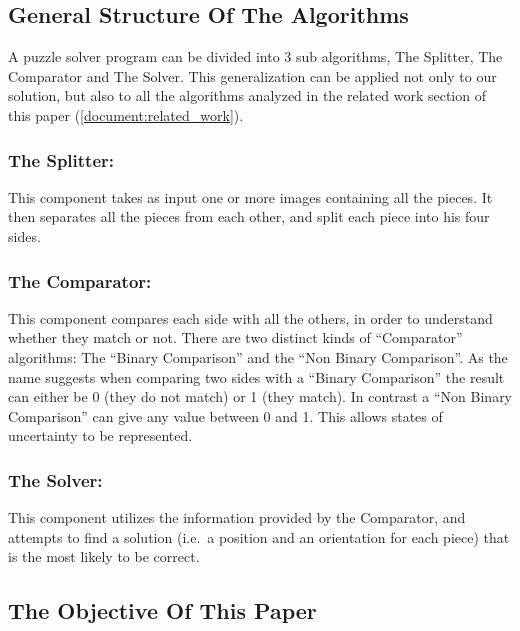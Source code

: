 \documentclass{article}
\newenvironment{indented_section}
  {\adjustwidth{3em}{0pt}}
  {\endadjustwidth}
\begin{document}
\subsection{General Structure Of The Algorithms}

A puzzle solver program can be divided into 3 sub algorithms,
The Splitter, The Comparator and The Solver.
This generalization can be applied not only to our solution,
but also to all the algorithms analyzed in the related
work section of this paper (\cref{document:related_work}).

\begin{indented_section}

    \subsubsection{The Splitter:} This component takes as input one or more images
    containing all the pieces. It then separates all the pieces from each other,
    and split each piece into his four sides.\label{document:splitter}

    \subsubsection{The Comparator:} This component compares each side with all the
    others, in order to understand whether they match or not.\newline
    There are two distinct kinds of “Comparator” algorithms:
    The “Binary Comparison” and the “Non Binary Comparison”.
    As the name suggests when comparing two sides with a “Binary Comparison”
    the result can either be 0 (they do not match) or 1 (they match).
    In contrast a “Non Binary Comparison” can give any value between 0 and 1.
    This allows states of uncertainty to be represented.\label{document:comparator}

    \subsubsection{The Solver:} This component utilizes the information provided by the
    Comparator, and attempts to find a solution
    (i.e.\ a position and an orientation for each piece)
    that is the most likely to be correct.\label{document:solver}

\end{indented_section}


\subsection{The Objective Of This Paper}\label{document:objective}
\end{document}
